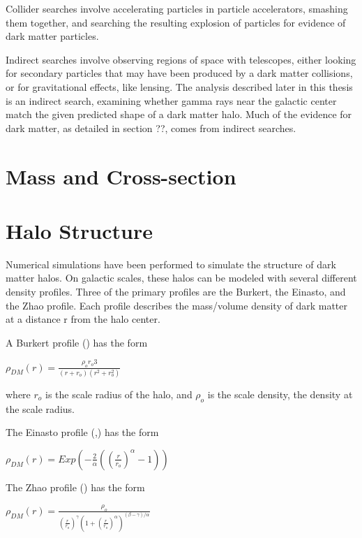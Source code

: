 Collider searches involve accelerating particles in particle accelerators, smashing them together, and searching the resulting explosion of particles for evidence of dark matter particles.

Indirect searches involve observing regions of space with telescopes, either looking for secondary particles that may have been produced by a dark matter collisions, or for gravitational effects, like lensing.
The analysis described later in this thesis is an indirect search, examining whether gamma rays near the galactic center match the given predicted shape of a dark matter halo.
Much of the evidence for dark matter, as detailed in section ??, comes from indirect searches.



\section{Mass and Cross-section}


\section{Halo Structure}
Numerical simulations have been performed to simulate the structure of dark matter halos.
On galactic scales, these halos can be modeled with several different density profiles.
Three of the primary profiles are the Burkert, the Einasto, and the Zhao profile.
Each profile describes the mass/volume density of dark matter at a distance r from the halo center.

A Burkert profile (\cite{burkertprofile}) has the form

$ \rho_{DM} \left( r \right) = \frac{ \rho_o r_o3}{ \left( r + r_o \right) \left( r^2 + r_o^2 \right)} $ \label{eqn:burkert}

where $r_o$ is the scale radius of the halo, and $\rho_o$ is the scale density, the density at the scale radius.

The Einasto profile (\cite{einastoprofile1},\cite{einastoprofile2}) has the form

$ \rho_{DM} \left( r \right) = Exp \left( - \frac{2}{\alpha} \left( {\left( \frac{r}{r_o} \right)}^{\alpha} - 1 \right) \right)$ \label{eqn:einasto}

The Zhao profile (\cite{zhaoprofile}) has the form

$ \rho_{DM} \left( r \right) = \frac{\rho_o}{ {\left( \frac{r}{r_o} \right)}^{\gamma} {\left( 1 + {\left( \frac{r}{r_o} \right)}^{\alpha} \right)}^{ \left(\beta - \gamma \right) / \alpha} } $ \label{eqn:zhao}

